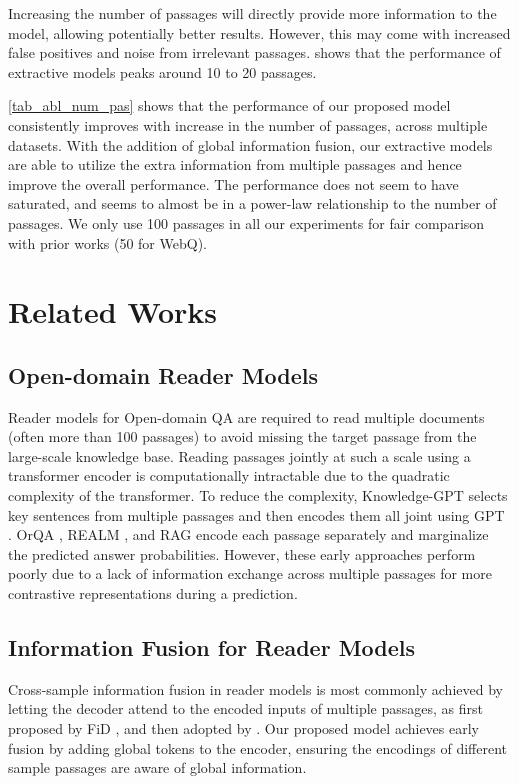 \documentclass[11pt]{article}
\begin{document}
Increasing the number of passages will directly provide more information to the model, allowing potentially better results. However, this may come with increased false positives and noise from irrelevant passages. \citet{wang-etal-2019-multi} shows that the performance of extractive models peaks around 10 to 20 passages. 

\cref{tab_abl_num_pas} shows that the performance of our proposed model consistently improves with increase in the number of passages, across multiple datasets. With the addition of global information fusion, our extractive models are able to utilize the extra information from multiple passages and hence improve the overall performance. The performance does not seem to have saturated, and seems to almost be in a power-law relationship to the number of passages. We only use 100 passages in all our experiments for fair comparison with prior works (50 for WebQ).
  \section{Related Works}
\subsection{Open-domain Reader Models}
Reader models for Open-domain QA are required to read multiple documents (often more than 100 passages) \cite{fid,r2d2} to avoid missing the target passage from the large-scale knowledge base. Reading passages jointly at such a scale using a transformer encoder is computationally intractable due to the quadratic complexity of the transformer. To reduce the complexity, Knowledge-GPT \cite{knowledgegpt} selects key sentences from multiple passages and then encodes them all joint using GPT \cite{radford2019language}. OrQA \cite{orqa}, REALM \cite{realm}, and RAG \cite{rag} encode each passage separately and marginalize the predicted answer probabilities. However, these early approaches perform poorly due to a lack of information exchange across multiple passages for more contrastive representations during a prediction.

\subsection{Information Fusion for Reader Models}

Cross-sample information fusion in reader models is most commonly achieved by letting the decoder attend to the encoded inputs of multiple passages, as first proposed by FiD \cite{fid}, and then adopted by \citet{fidkd, emdr2, kgfid, r2d2, cheng-etal-2021-unitedqa}. Our proposed model achieves early fusion by adding global tokens to the encoder, ensuring the encodings of different sample passages are aware of global information.
\end{document}
